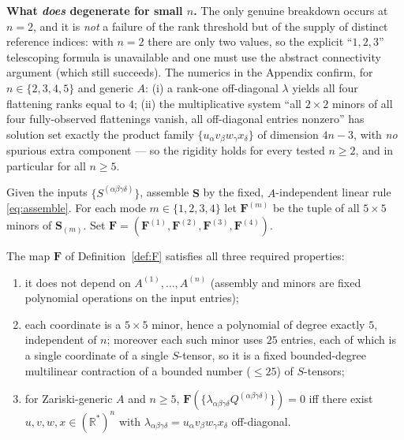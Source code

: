 \begin{remark}
\medskip
\noindent\textbf{What \emph{does} degenerate for small $n$.} The only genuine breakdown
occurs at $n=2$, and it is \emph{not} a failure of the rank threshold but of the supply of
distinct reference indices: with $n=2$ there are only two values, so the explicit
``$1,2,3$'' telescoping formula is unavailable and one must use the abstract connectivity
argument (which still succeeds). The numerics in the Appendix confirm, for
$n\in\{2,3,4,5\}$ and generic $A$: (i) a rank-one off-diagonal $\lambda$ yields all four
flattening ranks equal to $4$; (ii) the multiplicative system ``all $2\times2$ minors of all
four fully-observed flattenings vanish, all off-diagonal entries nonzero'' has solution set
exactly the product family $\{u_\alpha v_\beta w_\gamma x_\delta\}$ of dimension $4n-3$,
with \emph{no} spurious extra component --- so the rigidity holds for every tested $n\ge2$,
and in particular for all $n\ge5$.
\end{remark}

\begin{definition}\label{def:F}
Given the inputs $\{S^{(\alpha\beta\gamma\delta)}\}$, assemble $\mathbf S$ by the fixed,
$A$-independent linear rule \eqref{eq:assemble}. For each mode $m\in\{1,2,3,4\}$ let
$\mathbf F^{(m)}$ be the tuple of all $5\times5$ minors of $\mathbf S_{(m)}$. Set
$\mathbf F=(\mathbf F^{(1)},\mathbf F^{(2)},\mathbf F^{(3)},\mathbf F^{(4)})$.
\end{definition}

\begin{theorem}\label{thm:main}
The map $\mathbf F$ of Definition~\ref{def:F} satisfies all three required properties:
\begin{enumerate}
\item it does not depend on $A^{(1)},\dots,A^{(n)}$ (assembly and minors are fixed
polynomial operations on the input entries);
\item each coordinate is a $5\times5$ minor, hence a polynomial of degree exactly $5$,
independent of $n$; moreover each such minor uses $25$ entries, each of which is a single
coordinate of a single $S$-tensor, so it is a fixed bounded-degree multilinear
contraction of a bounded number ($\le25$) of $S$-tensors;
\item for Zariski-generic $A$ and $n\ge5$,
$\mathbf F(\{\lambda_{\alpha\beta\gamma\delta}Q^{(\alpha\beta\gamma\delta)}\})=0$ iff
there exist $u,v,w,x\in(\mathbb R^*)^n$ with
$\lambda_{\alpha\beta\gamma\delta}=u_\alpha v_\beta w_\gamma x_\delta$ off-diagonal.
\end{enumerate}
\end{theorem}

